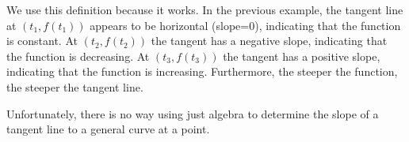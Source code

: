 \documentclass[letterpaper,12pt,fleqn]{article}
\begin{document}
We use this definition because it works.  In the previous example, the tangent line at \((t_1,f(t_1))\) appears to
be horizontal (slope=0), indicating that the function is constant.  At \((t_2,f(t_2))\) the tangent has a negative
slope, indicating that the function is decreasing.  At \((t_3,f(t_3))\) the tangent has a positive slope,
indicating that the function is increasing.  Furthermore, the steeper the function, the steeper the tangent line.

Unfortunately, there is no way using just algebra to determine the slope of a tangent line to a general curve at a
point.
\end{document}
